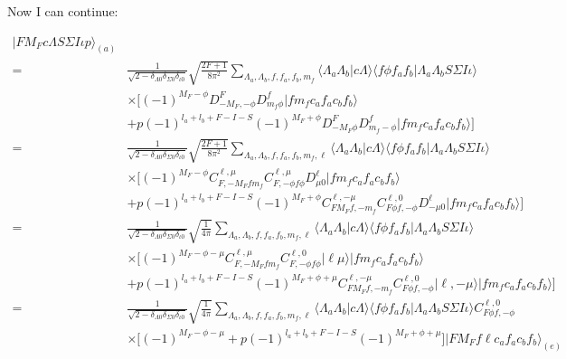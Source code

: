\documentclass[prl, longbibliography]{revtex4-2}
\begin{document}
Now I can continue:

\begin{equation}
\begin{split}
|F M_F c \Lambda S \Sigma I \iota p\rangle_{(a)}\\
= &\frac{1}{\sqrt{2-\delta_{\Lambda 0}\delta_{\Sigma 0}\delta_{\iota 0}}}
\sqrt{\frac{2F+1}{8\pi^2}}
\sum_{\Lambda_a, \Lambda_b, f, f_a, f_b, m_f}
\langle\Lambda_a \Lambda_b|c\Lambda\rangle
\langle f\phi f_a f_b | \Lambda_a \Lambda_b S\Sigma I \iota \rangle\\
&\times\Bigg[
(-1)^{M_F-\phi}D_{-M_F,-\phi}^F
D_{m_f \phi}^{f}
|f m_f c_a f_a c_b f_b\rangle\\
&+
p(-1)^{l_a+l_b+F-I-S}
(-1)^{M_F+\phi}D_{-M_F\phi}^F
D_{m_f -\phi}^{f}
|f m_f c_a f_a c_b f_b\rangle\Bigg]\\
= &\frac{1}{\sqrt{2-\delta_{\Lambda 0}\delta_{\Sigma 0}\delta_{\iota 0}}}
\sqrt{\frac{2F+1}{8\pi^2}}
\sum_{\Lambda_a, \Lambda_b, f, f_a, f_b, m_f, \ell}
\langle\Lambda_a \Lambda_b|c\Lambda\rangle
\langle f\phi f_a f_b | \Lambda_a \Lambda_b S\Sigma I \iota \rangle\\
&\times\Bigg[
(-1)^{M_F-\phi}
C_{F,-M_Ffm_f}^{\ell,\mu}
C_{F,-\phi f\phi}^{\ell,\mu}
D_{\mu 0}^\ell
|f m_f c_a f_a c_b f_b\rangle\\
&+
p(-1)^{l_a+l_b+F-I-S}
(-1)^{M_F+\phi}
C_{FM_Ff,-m_f}^{\ell,-\mu}
C_{F\phi f,-\phi}^{\ell,0}
D_{-\mu 0}^\ell
|f m_f c_a f_a c_b f_b\rangle\Bigg]
\\
= &\frac{1}{\sqrt{2-\delta_{\Lambda 0}\delta_{\Sigma 0}\delta_{\iota 0}}}
\sqrt{\frac{1}{4\pi}}
\sum_{\Lambda_a, \Lambda_b, f, f_a, f_b, m_f, \ell}
\langle\Lambda_a \Lambda_b|c\Lambda\rangle
\langle f\phi f_a f_b | \Lambda_a \Lambda_b S\Sigma I \iota \rangle\\
&\times\Bigg[
(-1)^{M_F-\phi-\mu}
C_{F,-M_Ffm_f}^{\ell,\mu}
C_{F,-\phi f\phi}^{\ell, 0}
|\ell\mu\rangle
|f m_f c_a f_a c_b f_b\rangle\\
&+
p(-1)^{l_a+l_b+F-I-S}
(-1)^{M_F+\phi+\mu}
C_{FM_Ff,-m_f}^{\ell,-\mu}
C_{F\phi f,-\phi}^{\ell,0}
|\ell,-\mu\rangle
|f m_f c_a f_a c_b f_b\rangle\Bigg]
\\
= &\frac{1}{\sqrt{2-\delta_{\Lambda 0}\delta_{\Sigma 0}\delta_{\iota 0}}}
\sqrt{\frac{1}{4\pi}}
\sum_{\Lambda_a, \Lambda_b, f, f_a, f_b, m_f, \ell}
\langle\Lambda_a \Lambda_b|c\Lambda\rangle
\langle f\phi f_a f_b | \Lambda_a \Lambda_b S\Sigma I \iota \rangle
C_{F\phi f,-\phi}^{\ell,0}\\
&\times\Bigg[
(-1)^{M_F-\phi-\mu}
+p(-1)^{l_a+l_b+F-I-S}
(-1)^{M_F+\phi+\mu}\Bigg]|F M_F f \ell c_a f_a c_b f_b\rangle_(e)
\end{split}
\end{equation}
\end{document}
